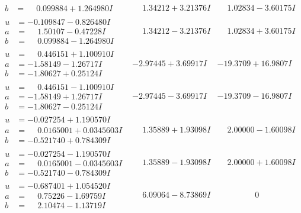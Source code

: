 \documentclass[1p]{elsarticle_modified}
\theoremstyle{definition}
\begin{document}
$$\begin{array}{c|c|c}
\begin{aligned}
b &= \phantom{-}0.099884 + 1.264980 I\end{aligned}
 & \phantom{-}1.34212 + 3.21376 I & \phantom{-}1.02834 - 3.60175 I \\ \hline\begin{aligned}
u &= -0.109847 - 0.826480 I \\
a &= \phantom{-}1.50107 - 0.47228 I \\
b &= \phantom{-}0.099884 - 1.264980 I\end{aligned}
 & \phantom{-}1.34212 - 3.21376 I & \phantom{-}1.02834 + 3.60175 I \\ \hline\begin{aligned}
u &= \phantom{-}0.446151 + 1.100910 I \\
a &= -1.58149 - 1.26717 I \\
b &= -1.80627 + 0.25124 I\end{aligned}
 & -2.97445 + 3.69917 I & -19.3709 + 16.9807 I \\ \hline\begin{aligned}
u &= \phantom{-}0.446151 - 1.100910 I \\
a &= -1.58149 + 1.26717 I \\
b &= -1.80627 - 0.25124 I\end{aligned}
 & -2.97445 - 3.69917 I & -19.3709 - 16.9807 I \\ \hline\begin{aligned}
u &= -0.027254 + 1.190570 I \\
a &= \phantom{-}0.0165001 + 0.0345603 I \\
b &= -0.521740 + 0.784309 I\end{aligned}
 & \phantom{-}1.35889 + 1.93098 I & \phantom{-}2.00000 - 1.60098 I \\ \hline\begin{aligned}
u &= -0.027254 - 1.190570 I \\
a &= \phantom{-}0.0165001 - 0.0345603 I \\
b &= -0.521740 - 0.784309 I\end{aligned}
 & \phantom{-}1.35889 - 1.93098 I & \phantom{-}2.00000 + 1.60098 I \\ \hline\begin{aligned}
u &= -0.687401 + 1.054520 I \\
a &= \phantom{-}0.75226 - 1.69759 I \\
b &= \phantom{-}2.10474 - 1.13719 I\end{aligned}
 & \phantom{-}6.09064 - 8.73869 I & \phantom{-0.000000 } 0 \\ \hline\begin{aligned}

\end{aligned}
\end{array}$$
\end{document}
